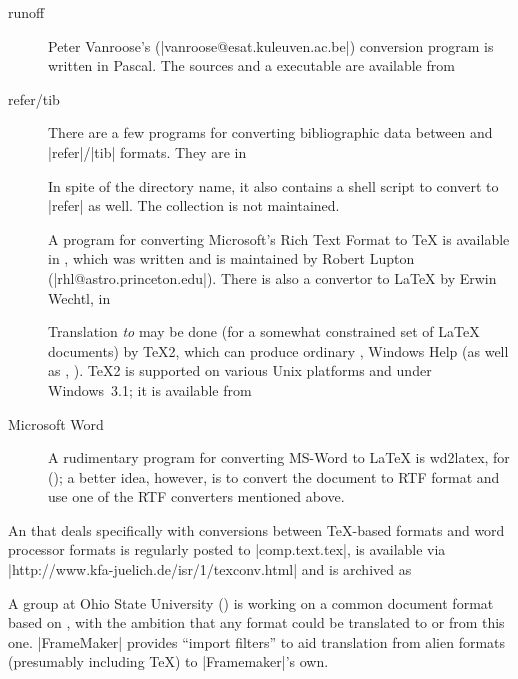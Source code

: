 \begin{description}
\item[runoff] Peter Vanroose's (\Email|vanroose@esat.kuleuven.ac.be|)
  conversion program is written in  Pascal.
  The sources and a  executable are available from

\item[refer/tib] There are a few programs for converting bibliographic
  data between \BibTeX{} and \ProgName|refer|/\ProgName|tib| formats.
  They are in 

  In spite of the directory name, it also contains a shell script to
  convert \BibTeX{} to \ProgName|refer| as well. The collection
  is not maintained.

\item[] A program for converting Microsoft's Rich Text Format to
  \TeX{} is available in , which was written and is
  maintained by Robert Lupton (\Email|rhl@astro.princeton.edu|).
  There is also a convertor to \LaTeX{} by Erwin Wechtl, in

  Translation \emph{to}  may be done (for a somewhat
  constrained set of \LaTeX{} documents) by \TeX{}2, which
  can produce ordinary , Windows Help  (as well as
  , ).
  \TeX{}2 is supported on various Unix platforms and under
  Windows~3.1; it is available from 

\item[Microsoft Word] A rudimentary program for converting MS-Word to
  \LaTeX{} is wd2latex, for \MSDOS{} (); a better
  idea, however, is to convert the document to RTF format and use one
  of the RTF converters mentioned above.
\end{description}

An  that deals specifically with conversions between
\TeX{}-based formats and word processor formats is regularly posted to
\Newsgroup|comp.text.tex|, is available via
\URL|http://www.kfa-juelich.de/isr/1/texconv.html| and is archived as

A group at Ohio State University () is working on
a common document format based on , with the ambition that any
format could be
translated to or from this one.  \ProgName|FrameMaker| provides
``import filters'' to aid translation from alien formats
(presumably including \TeX{}) to \ProgName|Framemaker|'s own.

